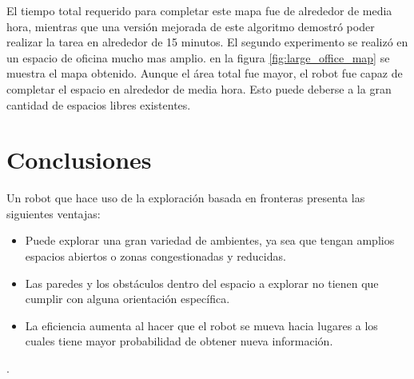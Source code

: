 \documentclass[11pt]{article}
\begin{document}
El tiempo total requerido para completar este mapa fue de alrededor de media hora, mientras que una versión mejorada de este algoritmo demostró poder realizar la tarea en alrededor de 15 minutos. El segundo experimento se realizó en un espacio de oficina mucho mas amplio. en la figura \ref{fig:large_office_map} se muestra el mapa obtenido. Aunque el área total fue mayor, el robot fue capaz de completar el espacio en alrededor de media hora. Esto puede deberse a la gran cantidad de espacios libres existentes.

\section*{Conclusiones}

Un robot que hace uso de la exploración basada en fronteras presenta las siguientes ventajas:

\begin{itemize}[noitemsep]
	\item Puede explorar una gran variedad de ambientes, ya sea que tengan amplios espacios abiertos o zonas congestionadas y reducidas.
	\item Las paredes y los obstáculos dentro del espacio a explorar no tienen que cumplir con alguna orientación específica.
	\item La eficiencia aumenta al hacer que el robot se mueva hacia lugares a los cuales tiene mayor probabilidad de obtener nueva información.
\end{itemize}.

%
%
\end{document}
